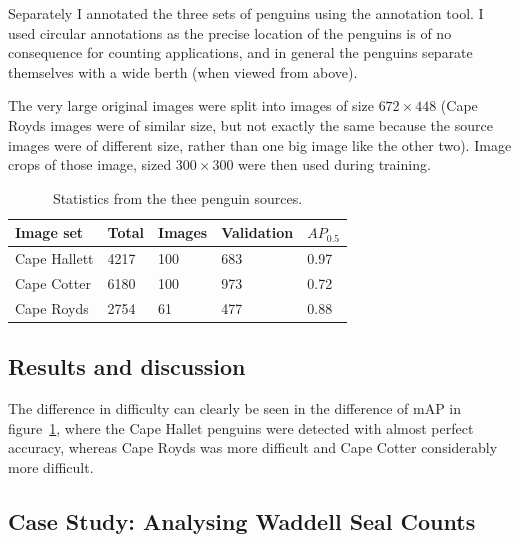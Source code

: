Separately I annotated the three sets of penguins using the annotation tool. I used circular annotations as the precise location of the penguins is of no consequence for counting applications, and in general the penguins separate themselves with a wide berth (when viewed from above).  

The very large original images were split into images of size $ 672\times448 $ (Cape Royds images were of similar size, but not exactly the same because the source images were of different size, rather than one big image like the other two). Image crops of those image, sized $ 300\times300 $ were then used during training.

\begin{table}[ht]
  \centering
    \caption{Statistics from the thee penguin sources. }
  \begin{tabular}{ l  l  l  l  l }
    Image set & Total & Images & Validation & $AP_0.5$ \\
    \toprule
    Cape Hallett  & 4217 & 100 & 683 & 0.97 \\
    Cape Cotter   & 6180 & 100 & 973 & 0.72  \\
    Cape Royds    & 2754 & 61 & 477  & 0.88 \\
    \bottomrule
  \end{tabular}

\label{fig:penguin_statistics}
\end{table}





\subsection{Results and discussion}
 
The difference in difficulty can clearly be seen in the difference of mAP in figure~\ref{fig:penguin_statistics}, where the Cape Hallet penguins were detected with almost perfect accuracy, whereas Cape Royds was more difficult and Cape Cotter considerably more difficult. 





\subsection{Case Study: Analysing Waddell Seal Counts}



